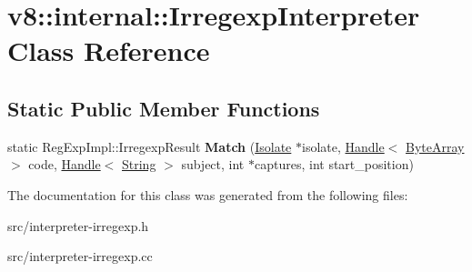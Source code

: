 \hypertarget{classv8_1_1internal_1_1_irregexp_interpreter}{}\section{v8\+:\+:internal\+:\+:Irregexp\+Interpreter Class Reference}
\label{classv8_1_1internal_1_1_irregexp_interpreter}
\subsection*{Static Public Member Functions}
\begin{DoxyCompactItemize}
\item 
\hypertarget{classv8_1_1internal_1_1_irregexp_interpreter_ab6c69638e4a2899e6682ffeec07b7e31}{}static Reg\+Exp\+Impl\+::\+Irregexp\+Result {\bfseries Match} (\hyperlink{classv8_1_1internal_1_1_isolate}{Isolate} $\ast$isolate, \hyperlink{classv8_1_1internal_1_1_handle}{Handle}$<$ \hyperlink{classv8_1_1internal_1_1_byte_array}{Byte\+Array} $>$ code, \hyperlink{classv8_1_1internal_1_1_handle}{Handle}$<$ \hyperlink{classv8_1_1internal_1_1_string}{String} $>$ subject, int $\ast$captures, int start\+\_\+position)\label{classv8_1_1internal_1_1_irregexp_interpreter_ab6c69638e4a2899e6682ffeec07b7e31}

\end{DoxyCompactItemize}


The documentation for this class was generated from the following files\+:\begin{DoxyCompactItemize}
\item 
src/interpreter-\/irregexp.\+h\item 
src/interpreter-\/irregexp.\+cc\end{DoxyCompactItemize}
